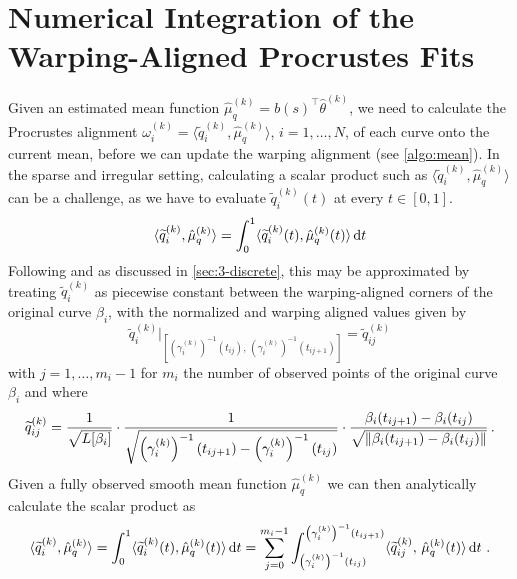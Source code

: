 \section{Numerical Integration of the Warping-Aligned Procrustes Fits}
\label{sec:3-pfits}
Given an estimated mean function $\hat\mu_q^{(k)} = b(s)^\top\hat\theta^{(k)}$, we need to calculate the Procrustes alignment $\omega_i^{(k)} = \langle \widetilde q_i^{(k)}, \hat\mu_q^{(k)} \rangle$, $i = 1,\dots,N$, of each curve onto the current mean, before we can update the warping alignment (see \cref{algo:mean}).
In the sparse and irregular setting, calculating a scalar product such as $\langle \widetilde q_i^{(k)}, \hat\mu_q^{(k)} \rangle$ can be a challenge, as we have to evaluate $\widetilde q_i^{(k)}(t)$ at every $t \in [0,1]$.
\begin{equation}
\langle \widetilde q_i^{(k)}, \hat\mu_q^{(k)} \rangle =
  \int_0^1 \langle \widetilde q_i^{(k)}(t), \hat\mu_q^{(k)}(t) \rangle \mathop{\mathrm{d}t}
\end{equation}
Following \cite{Steyer2021} and as discussed in \cref{sec:3-discrete}, this may be approximated by treating $\widetilde q_i^{(k)}$ as piecewise constant between the warping-aligned corners of the original curve $\beta_i$, with the normalized and warping aligned values given by
\begin{equation}
   \widetilde q_i^{(k)} \Big\rvert_{\left[\left(\gamma_i^{(k)}\right)^{-1}(t_{ij}),\, \left(\gamma_i^{(k)} \right)^{-1}(t_{ij+1})\right]} =
  \widetilde q_{ij}^{(k)}
\end{equation}
with $j = 1, \dots, m_i - 1$ for $m_i$ the number of observed points of the original curve $\beta_i$ and where
\begin{equation}
  \widetilde q_{ij}^{(k)} = 
  \frac{1}{\sqrt{L[\beta_i]}}\cdot \frac{1}{\sqrt{\left(\gamma_i^{(k)}\right)^{-1}(t_{ij+1}) - \left(\gamma_i^{(k)}\right)^{-1}(t_{ij})}} \cdot \frac{\beta_i(t_{ij+1}) - \beta_i(t_{ij})}{\sqrt{\lVert\beta_i(t_{ij+1}) - \beta_i(t_{ij})\rVert}} \,.
\end{equation}
Given a fully observed smooth mean function $\hat\mu_q^{(k)}$ we can then analytically calculate the scalar product as
\begin{equation}
\langle \widetilde q_i^{(k)}, \hat\mu_q^{(k)} \rangle =
  \int_0^1 \langle \widetilde q_i^{(k)}(t), \hat\mu_q^{(k)}(t) \rangle \mathop{\mathrm{d}t} =
  \sum_{j=0}^{m_i-1} \int_{\left(\gamma_i^{(k)}\right)^{-1}(t_{ij})}^{\left(\gamma_i^{(k)}\right)^{-1}(t_{ij+1})} \langle \widetilde q_{ij}^{(k)},\, \hat\mu_q^{(k)} (t) \rangle \mathop{\mathrm{d}t} \,.
\end{equation}
